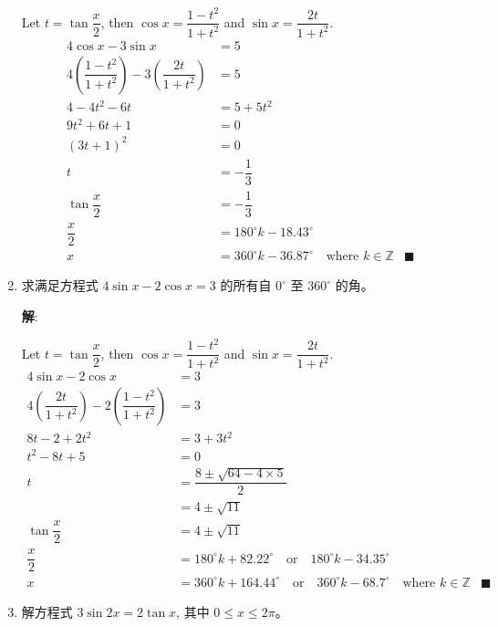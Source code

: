 \documentclass{report}
\newcommand{\sol}{\vspace{0.2cm}\textbf{解}:}
\begin{document}
\begin{enumerate}[leftmargin=*]
        Let $t = \tan\dfrac{x}{2}$, then $\cos x = \dfrac{1-t^2}{1+t^2}$ and $\sin x = \dfrac{2t}{1+t^2}$.
        \begin{align*}
            4 \cos x - 3 \sin x &= 5\\
            4 \left(\dfrac{1-t^2}{1+t^2}\right) - 3 \left(\dfrac{2t}{1+t^2}\right) &= 5\\
            4 - 4t^2 - 6t &= 5 + 5t^2\\
            9t^2 + 6t + 1 &= 0\\
            (3t + 1)^2 &= 0\\
            t &= -\dfrac{1}{3}\\
            \tan \dfrac{x}{2} &= -\dfrac{1}{3}\\
            \dfrac{x}{2} &= 180^{\circ} k - 18.43^{\circ}\\
            x &= 360^{\circ} k - 36.87^{\circ} \quad \text{where } k \in \mathbb{Z}& \blacksquare
        \end{align*}
        
        \item 求满足方程式 $4 \sin x-2 \cos x=3$ 的所有自 $0^{\circ}$ 至 $360^{\circ}$ 的角。
        
        \sol{}

        Let $t = \tan\dfrac{x}{2}$, then $\cos x = \dfrac{1-t^2}{1+t^2}$ and $\sin x = \dfrac{2t}{1+t^2}$.
        \begin{align*}
            4 \sin x - 2 \cos x &= 3\\
            4 \left(\dfrac{2t}{1+t^2}\right) - 2 \left(\dfrac{1-t^2}{1+t^2}\right) &= 3\\
            8t - 2 + 2t^2 &= 3 + 3t^2\\
            t^2 - 8t + 5 &= 0\\
            t &= \dfrac{8 \pm \sqrt{64 - 4 \times 5}}{2}\\
            & = 4 \pm \sqrt{11}\\
            \tan\dfrac{x}{2} &= 4 \pm \sqrt{11}\\
            \dfrac{x}{2} &= 180^{\circ} k + 82.22^{\circ} \quad \text{or} \quad 180^{\circ} k - 34.35^{\circ}\\
            x &= 360^{\circ} k + 164.44^{\circ} \quad \text{or} \quad 360^{\circ} k - 68.7^{\circ} \quad \text{where } k \in \mathbb{Z}& \blacksquare
        \end{align*}
        
        \item 解方程式 $3 \sin 2 x=2 \tan x$, 其中 $0 \leq x \leq 2 \pi$。
        

\end{enumerate}
\end{document}
